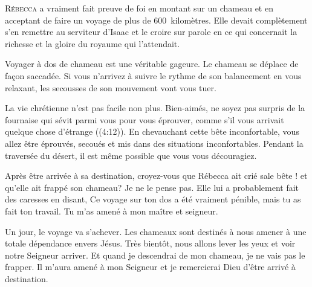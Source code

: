 



\lettrine{R}{ébecca} a vraiment fait preuve de foi
 en montant sur un chameau et en acceptant de faire un voyage
 de plus de 600~kilomètres.
 Elle devait complètement s'en remettre au serviteur d'Isaac
 et le croire sur parole en ce qui concernait la richesse
 et la gloire du royaume qui l'attendait. 

Voyager à dos de chameau est une véritable gageure.
 Le chameau se déplace de fa\c{c}on saccadée.
 Si vous n'arrivez à suivre le rythme de son balancement
 en vous relaxant, les secousses de son mouvement vont vous tuer.

La vie chrétienne n'est pas facile non plus.
 \Og Bien-aimés, ne soyez pas surpris de la fournaise qui sévit
 parmi vous pour vous éprouver, comme s'il vous arrivait
 quelque chose d'étrange \Fg{} ((4:12)).
 En chevauchant cette bête inconfortable, vous allez être éprouvés,
 secoués et mis dans des situations inconfortables.
 Pendant la traversée du désert,
 il est même possible que vous vous découragiez. 

Après être arrivée à sa destination,
 croyez-vous que Rébecca ait crié \Og sale bête ! \Fg{}
 et qu'elle ait frappé son chameau? Je ne le pense pas.
 Elle lui a probablement fait des caresses en disant,
 \Og Ce voyage sur ton dos a été vraiment pénible,
 mais tu as fait ton travail. Tu m'as amené à mon maître et seigneur. \Fg{}


Un jour, le voyage va s'achever. Les chameaux sont destinés à nous amener
 à une totale dépendance envers Jésus.
 Très bientôt, nous allons lever les yeux et voir notre Seigneur arriver.
 Et quand je descendrai de mon chameau, je ne vais pas le frapper.
 Il m'aura amené à mon Seigneur et je remercierai Dieu
 d'être arrivé à destination. 

\dvrule



